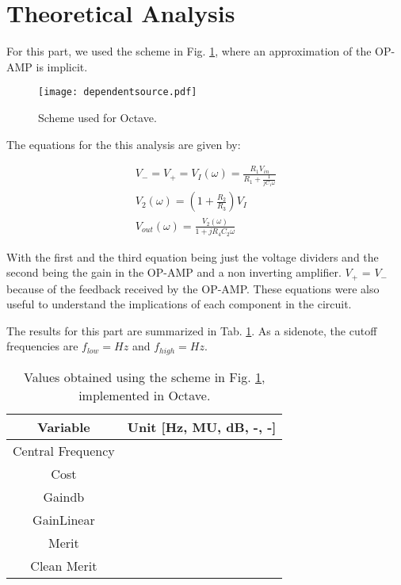 \section{Theoretical Analysis}

For this part, we used the scheme in Fig. \ref{fig:joaoscheme}, where an approximation of the OP-AMP is implicit.

\begin{figure}[H]
    \centering
    \texttt{[image: dependentsource.pdf]}
    \caption{Scheme used for Octave.}
    \label{fig:joaoscheme}
\end{figure}

The equations for the this analysis are given by:

\begin{gather}
 V_-=V_+=V_I(\omega) = \frac{R_{1} V_{in}}{R_1+\frac{1}{jC_1\omega}} \\
 V_2(\omega) = \left(1+\frac{R_2}{R_3} \right)V_I\\
 V_{out}(\omega) = \frac{V_2(\omega)}{1+jR_4C_2\omega}
\end{gather}

With the first and the third equation being just the voltage dividers and the second being the gain in the OP-AMP and a non inverting amplifier. $V_{+}$ = $V_{-}$ because of the feedback received by the OP-AMP. These equations were also useful to understand the implications of each component in the circuit.

The results for this part are summarized in Tab. \ref{tab:valuesoctave}. As a sidenote, the cutoff frequencies are $f_{low} = Hz$ and $f_{high} = Hz$.

\begin{table}[H]
    \centering
    \begin{tabular}{|c|c|}
        \hline
        Variable & Unit [Hz, MU, dB, -, -]\\ 
        \hline
        Central Frequency & \\
        \hline
        Cost & \\
        \hline
        Gaindb & \\
        \hline
        GainLinear & \\
        \hline
        Merit & \\
        \hline
        Clean Merit & \\
        \hline
    \end{tabular}
    \caption{Values obtained using the scheme in Fig. \ref{fig:joaoscheme}, implemented in Octave.}
    \label{tab:valuesoctave}
\end{table}

